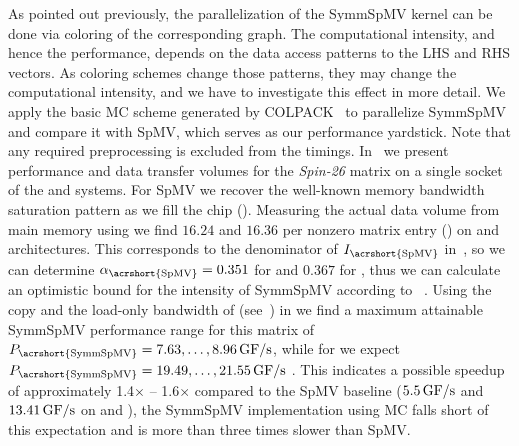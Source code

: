 
As pointed out previously, the parallelization of
the \acrshort{SymmSpMV} kernel can be done
via \DTWO coloring of the corresponding graph. The computational
intensity, and hence the performance, depends on the data access
patterns to the LHS and RHS vectors. As coloring schemes change those
patterns, they may change the computational intensity, and we have to
investigate this effect in more detail. We apply the basic
\acrshort{MC} scheme generated by COLPACK~\cite{COLPACK} to
parallelize \acrshort{SymmSpMV} and compare it with \acrshort{SpMV},
which serves as our performance yardstick. Note that any required
preprocessing is excluded from the timings. In~
we present performance and data transfer volumes for
the \emph{Spin-26} matrix on a single socket of the \IVB
and \SKX systems. For \acrshort{SpMV} we recover the well-known memory bandwidth
saturation pattern as we fill the chip ().
 Measuring the actual data volume from main memory using \LIKWID
we find $16.24$ and $16.36$ \BYTE per nonzero matrix entry ()
on \IVB and \SKX architectures.
 This corresponds to the denominator of
$I_\mathrm{\acrshort{SpMV}}$ in~, so we can
determine $\alpha_\mathrm{\acrshort{SpMV}}=0.351$ for \IVB and $0.367$ for \SKX, thus we can calculate an 
optimistic bound for the intensity of \acrshort{SymmSpMV} according to ~.
 Using the copy and the load-only bandwidth of \IVB (see~) 
 in  we find a maximum
attainable {\acrshort{SymmSpMV}} performance range for this matrix of
$P_\mathrm{\acrshort{SymmSpMV}}=7.63,\ldots,8.96\,\GF$, while for \SKX we expect  $P_\mathrm{\acrshort{SymmSpMV}}=19.49,\ldots,21.55\,\GF$ . This indicates a possible
speedup of approximately 1.4$\times$ -- 1.6$\times$ compared to the \acrshort{SpMV}
baseline ($5.5\,\mbox{GF/s}$ and $13.41\,\mbox{GF/s}$ on \IVB and \SKX), the \acrshort{SymmSpMV} implementation
using \acrshort{MC} falls short of this expectation and is more than
three times slower than \acrshort{SpMV}.
